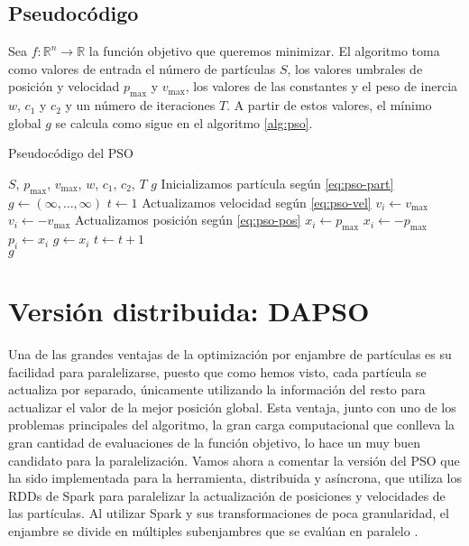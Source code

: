 \subsection{Pseudocódigo}

Sea $f:\mathbb{R}^n\to\mathbb{R}$ la función objetivo que queremos minimizar. El algoritmo toma como valores de 
entrada el número de partículas $S$, los valores umbrales de posición y velocidad $p_{\max}$ y $v_{\max}$, los valores
de las constantes y el peso de inercia $w$, $c_1$ y $c_2$ y un número de iteraciones $T$. A partir de estos valores,
el mínimo global $g$ se calcula como sigue en el algoritmo \ref{alg:pso}.

\begin{algorithm}[htb!]
\caption{Pseudocódigo del PSO}\label{alg:pso}
\begin{algorithmic}[1]
\Require $S$, $p_{\max}$, $v_{\max}$, $w$, $c_1$, $c_2$, $T$
\Ensure $g$
    \State Inicializamos partícula según \eqref{eq:pso-part} 
\EndFor
\State $g\gets (\infty,\dots,\infty)$
\State $t\gets 1$
    \State Actualizamos velocidad según \eqref{eq:pso-vel}
        \State $v_i\gets v_{\max}$
        \State $v_i\gets -v_{\max}$
    \EndIf
    \State Actualizamos posición según \eqref{eq:pso-pos}
        \State $x_i\gets p_{\max}$
        \State $x_i\gets -p_{\max}$
    \EndIf
        \State $p_i\gets x_i$
    \EndIf
        \State $g\gets x_i$
    \EndIf
    \EndFor
    \State $t\gets t+1$
\EndWhile
\\\Return $g$
\end{algorithmic}
\end{algorithm}

\section{Versión distribuida: DAPSO}

Una de las grandes ventajas de la optimización por enjambre de partículas es su facilidad para paralelizarse, puesto
que como hemos visto, cada partícula se actualiza por separado, únicamente utilizando la información del resto para
actualizar el valor de la mejor posición global. Esta ventaja, junto con uno de los problemas principales del algoritmo, la gran carga computacional que conlleva la gran cantidad de evaluaciones de la función objetivo, lo hace
un muy buen candidato para la paralelización. Vamos ahora a comentar la versión del PSO que ha sido implementada 
para la herramienta, distribuida y asíncrona, que utiliza los RDDs de Spark para paralelizar la actualización de
posiciones y velocidades de las partículas. Al utilizar Spark y sus transformaciones de poca granularidad, el 
enjambre se divide en múltiples subenjambres que se evalúan en paralelo \cite{dapso}.

